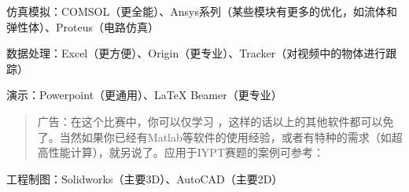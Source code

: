 \documentclass[a4paper,10pt,english]{sphinxmanual}
\begin{document}
仿真模拟：COMSOL（更全能）、Ansys系列（某些模块有更多的优化，如流体和弹性体）、Proteus（电路仿真）

数据处理：Excel（更方便）、Origin（更专业）、Tracker（对视频中的物体进行跟踪）

演示：Powerpoint（更通用）、LaTeX Beamer（更专业）
\begin{quote}

广告：在这个比赛中，你可以仅学习  ，这样的话以上的其他软件都可以免了。当然如果你已经有Matlab等软件的使用经验，或者有特种的需求（如超高性能计算），就另说了。应用于IYPT赛题的案例可参考： 
\end{quote}

工程制图：Solidworks（主要3D）、AutoCAD（主要2D）



\renewcommand{\indexname}{索引}
\printindex
\end{document}
